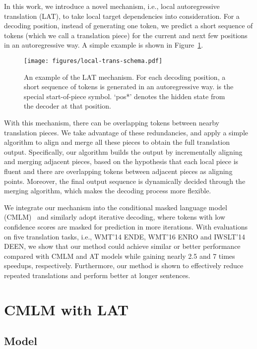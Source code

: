 \documentclass[11pt,a4paper]{article}
\begin{document}
In this work, we introduce a novel mechanism, i.e., local autoregressive translation (LAT), to take local target dependencies into consideration. For a decoding position, instead of generating one token, we predict a short sequence of tokens (which we call a translation piece) for the current and next few positions in an autoregressive way. A simple example is shown in Figure~\ref{fig:local_trans_schema}. 
\begin{figure}
    \centering
    \texttt{[image: figures/local-trans-schema.pdf]}
    \caption{An example of the LAT mechanism. For each decoding position, a short sequence of tokens is generated in an autoregressive way.  is the special start-of-piece symbol. `pos*' denotes the hidden state from the decoder at that position.}
    \label{fig:local_trans_schema}
\end{figure}

With this mechanism, there can be overlapping tokens between nearby translation pieces. We take advantage of these redundancies, and apply a simple algorithm to align and merge all these pieces to obtain the full translation output. Specifically, our algorithm builds the output by incrementally aligning and merging adjacent pieces, based on the hypothesis that each local piece is fluent and there are overlapping tokens between adjacent pieces as aligning points. 
Moreover, the final output sequence is dynamically decided through the merging algorithm, which makes the decoding process more flexible.

We integrate our mechanism into the conditional masked language model (CMLM)~\cite{ghazvininejad-etal-2019-mask} and similarly adopt iterative decoding, where tokens with low confidence scores are masked for prediction in more iterations. With evaluations on five translation tasks, i.e., WMT'14 ENDE, WMT'16 ENRO and IWSLT'14 DEEN, we show that our method could achieve similar or better performance compared with CMLM and AT models while gaining nearly 2.5 and 7 times speedups, respectively. 
Furthermore, our method is shown to effectively reduce repeated translations and perform better at longer sentences.


\section{CMLM with LAT}
\label{sec:method}

\subsection{Model}
\end{document}
